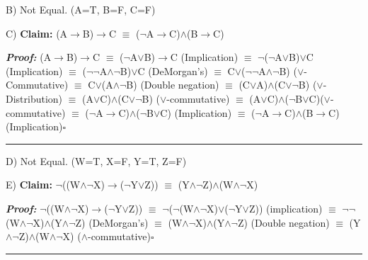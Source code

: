 \documentclass{article}
\begin{document}
B) Not Equal. (A=T, B=F, C=F)\newline\newline

C) \textbf{Claim: } (A$\rightarrow$B)$\rightarrow$C $\equiv$ ($\neg$A$\rightarrow$C)$\wedge$(B$\rightarrow$C)\newline

\textbf{\textit{Proof: }}\newline
(A$\rightarrow$B)$\rightarrow$C $\equiv$ ($\neg$A$\lor$B)$\rightarrow$C (Implication)\newline
$\equiv$ $\neg$($\neg$A$\lor$B)$\lor$C (Implication)\newline
$\equiv$ ($\neg$$\neg$A$\wedge$$\neg$B)$\lor$C (DeMorgan's)\newline
$\equiv$ C$\lor$($\neg$$\neg$A$\wedge$$\neg$B) ($\lor$-Commutative)\newline
$\equiv$ C$\lor$(A$\wedge$$\neg$B) (Double negation)\newline
$\equiv$ (C$\lor$A)$\wedge$(C$\lor$$\neg$B) ($\lor$-Distribution)\newline
$\equiv$ (A$\lor$C)$\wedge$(C$\lor$$\neg$B) ($\lor$-commutative)\newline
$\equiv$ (A$\lor$C)$\wedge$($\neg$B$\lor$C)($\lor$-commutative)\newline
$\equiv$ ($\neg$A$\rightarrow$C)$\wedge$($\neg$B$\lor$C) (Implication)\newline
$\equiv$ ($\neg$A$\rightarrow$C)$\wedge$(B$\rightarrow$C) (Implication)$\square$\newline\rule{10cm}{1pt}\newline

D) Not Equal. (W=T, X=F, Y=T, Z=F)\newline\newline

E) \textbf{Claim: } $\neg$((W$\wedge$$\neg$X)$\rightarrow$($\neg$Y$\lor$Z)) $\equiv$ (Y$\wedge$$\neg$Z)$\wedge$(W$\wedge$$\neg$X)\newline

\textbf{\textit{Proof: }}\newline
$\neg$((W$\wedge$$\neg$X)$\rightarrow$($\neg$Y$\lor$Z)) $\equiv$ $\neg$($\neg$(W$\wedge$$\neg$X)$\lor$($\neg$Y$\lor$Z)) (implication)\newline
$\equiv$ $\neg$$\neg$(W$\wedge$$\neg$X)$\wedge$(Y$\wedge$$\neg$Z) (DeMorgan's)\newline
$\equiv$ (W$\wedge$$\neg$X)$\wedge$(Y$\wedge$$\neg$Z) (Double negation)\newline
$\equiv$ (Y$\wedge$$\neg$Z)$\wedge$(W$\wedge$$\neg$X) ($\wedge$-commutative)$\square$\newline\rule{10cm}{1pt}\newline
\end{document}
